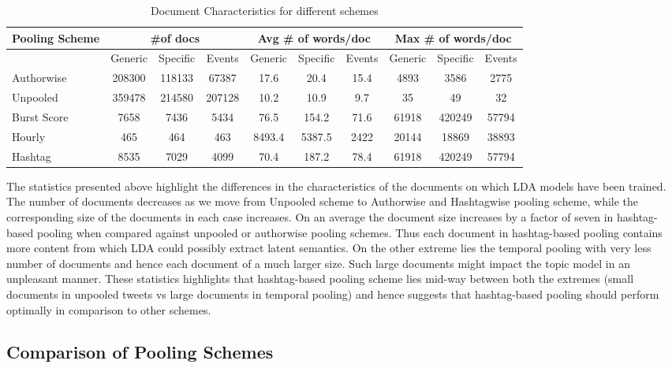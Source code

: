 \documentclass[10pt,a5paper,twoside]{article}
\begin{document}
\begin{table}[!h]
\centering
\resizebox{14cm}{!} 
{
	\begin{tabular}{|l|ccc|ccc|ccc|}
	\hline
	Pooling Scheme  & \multicolumn {3}{c}{\#of docs} & \multicolumn {3}{c}{Avg \# of words/doc} & \multicolumn {3}{c|}{Max \# of words/doc}\\
	\hline
	 & Generic & Specific & Events &  Generic & Specific & Events &  Generic & Specific & Events\\
	\hline
	Authorwise & 208300 & 118133 & 67387 & 17.6 & 20.4 & 15.4 & 4893 & 3586 & 2775 \\
	\hline
	Unpooled & 359478 & 214580 & 207128 & 10.2 & 10.9 & 9.7 & 35 & 49 & 32 \\
	\hline
	Burst Score & 7658 & 7436 & 5434 & 76.5 & 154.2 & 71.6 & 61918 & 420249 & 57794 \\
	\hline
	Hourly & 465 & 464 & 463 & 8493.4 & 5387.5 & 2422 & 20144 & 18869 & 38893 \\
	\hline
	Hashtag & 8535 & 7029 & 4099 & 70.4 & 187.2 & 78.4 & 61918 & 420249 & 57794 \\
	\hline
	\end{tabular}
}
\caption{Document Characteristics for different schemes}\label{tbl-3}
\end{table}

The statistics presented above highlight the differences in the
characteristics of the documents on which LDA models have been
trained. The number of documents decreases as we move from Unpooled
scheme to Authorwise and Hashtagwise pooling scheme, while the
corresponding size of the documents in each case increases. On an
average the document size increases by a factor of seven in hashtag-based
pooling when compared against unpooled or authorwise pooling
schemes. Thus each document in hashtag-based pooling contains more
content from which LDA could possibly extract latent semantics. On the
other extreme lies the temporal pooling with very less number of
documents and hence each document of a much larger size. Such large
documents might impact the topic model in an unpleasant manner. These
statistics highlights that hashtag-based pooling scheme lies mid-way
between both the extremes (small documents in unpooled tweets vs large
documents in temporal pooling) and hence suggests that hashtag-based
pooling should perform optimally in comparison to other schemes.

\subsection{Comparison of Pooling Schemes}
\end{document}
